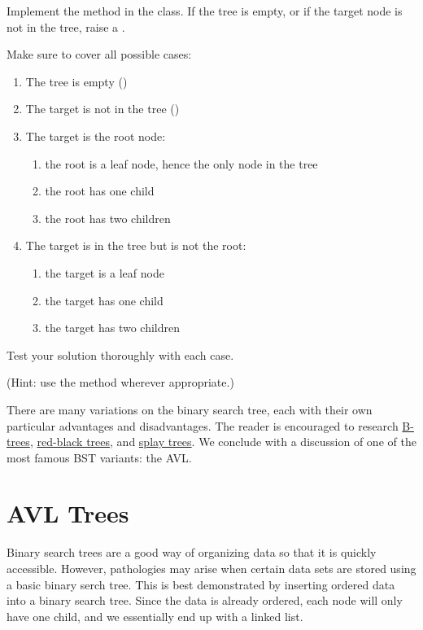 \begin{problem}
Implement the  method in the  class.
If the tree is empty, or if the target node is not in the tree, raise a .

Make sure to cover all possible cases:
\begin{enumerate}
\item The tree is empty ()
\item The target is not in the tree ()
\item The target is the root node:
	\begin{enumerate}
	\item{the root is a leaf node, hence the only node in the tree}
	\item{the root has one child}
	\item{the root has two children}
	\end{enumerate}
\item The target is in the tree but is not the root:
	\begin{enumerate}
	\item{the target is a leaf node}
	\item{the target has one child}
	\item{the target has two children}
	\end{enumerate}
\end{enumerate}
Test your solution thoroughly with each case.

(Hint: use the  method wherever appropriate.)
\end{problem}

There are many variations on the binary search tree, each with their own particular advantages and disadvantages.
The reader is encouraged to research \href{https://en.wikipedia.org/wiki/B-tree}{B-trees}, \href{https://en.wikipedia.org/wiki/Red%E2%80%93black_tree}{red-black trees}, and \href{https://en.wikipedia.org/wiki/Splay_tree}{splay trees}.
We conclude with a discussion of one of the most famous BST variants: the AVL.

\section*{AVL Trees}

Binary search trees are a good way of organizing data so that it is quickly accessible.
However, pathologies may arise when certain data sets are stored using a basic binary serch tree.
This is best demonstrated by inserting ordered data into a binary search tree.
Since the data is already ordered, each node will only have one child, and we essentially end up with a linked list.

